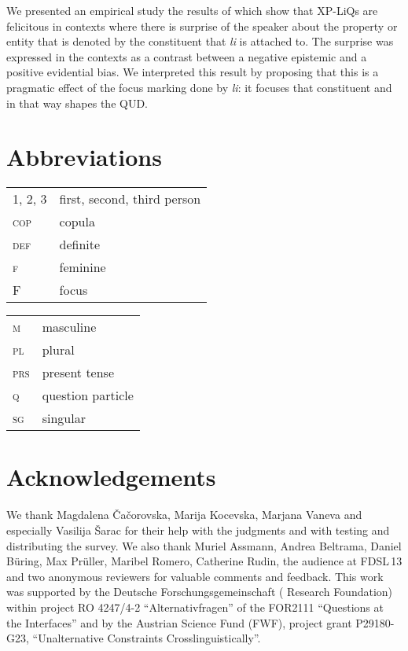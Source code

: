\documentclass[output=paper]{langscibook}
\begin{document}
We presented an empirical study the results of which show that XP-LiQs are felicitous in contexts where there is surprise of the speaker about the property or entity that is denoted by the constituent that \textit{li} is attached to. The surprise was expressed in the contexts as a contrast between a negative epistemic and a positive evidential bias. We interpreted this result by proposing that this is a pragmatic effect of the focus marking done by \textit{li}: it focuses that constituent and in that way shapes the QUD.

\section*{Abbreviations}

\begin{tabularx}{.5\textwidth}{@{}lX}
\textsc{1, 2, 3}&first, second, third person\\
\textsc{cop}&{copula}\\
\textsc{def}&{definite}\\
\textsc{f}&{feminine}\\
\textsc{F}&{focus}\\
\end{tabularx}%
\begin{tabularx}{.5\textwidth}{lX@{}}
\textsc{m}&{masculine}\\
\textsc{pl}&{plural}\\
\textsc{prs}&{present tense}\\
\textsc{q}&{question particle}\\
\textsc{sg}&singular\\
\end{tabularx}

\section*{Acknowledgements}

We thank Magdalena Čačorovska, Marija Kocevska, Marjana Vaneva and especially Vasilija Šarac for their help with the  judgments and with testing and distributing the survey. We also thank Muriel Assmann, Andrea Beltrama, Daniel Büring, Max Prüller, Maribel Romero, Catherine Rudin, the audience at FDSL\,13 and two anonymous reviewers for valuable comments and feedback. This work was supported by the Deutsche Forschungsgemeinschaft ( Research Foundation) within project RO 4247/4-2 ``Alternativfragen'' of the FOR2111 ``Questions at the Interfaces'' and by the Austrian Science Fund (FWF), project grant P29180-G23, ``Unalternative Constraints Crosslinguistically''.

{\sloppy\printbibliography[heading=subbibliography,notkeyword=this]}
\end{document}
